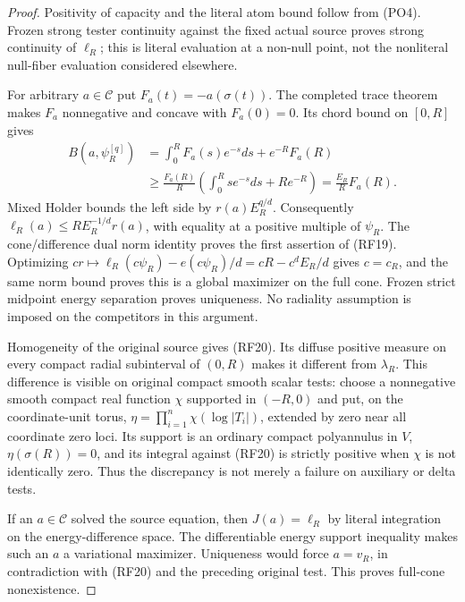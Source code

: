 \documentclass[11pt,a4paper]{article}
\numberwithin{equation}{section}
\theoremstyle{definition}
\theoremstyle{remark}
\begin{document}
\begin{proof}
Positivity of capacity and the literal atom bound
follow from \textup{(PO4)}.  Frozen strong tester
continuity against the fixed actual source proves
strong continuity of $\ell_R$; this is literal
evaluation at a non-null point, not the nonliteral
null-fiber evaluation considered elsewhere.

For arbitrary $a\in\mathscr C$ put
$F_a(t)=-a(\sigma(t))$.  The completed trace theorem
makes $F_a$ nonnegative and concave with $F_a(0)=0$.
Its chord bound on $[0,R]$ gives
\[
 \begin{split}
 B(a,\psi_R^{[q]})
   &=\int_0^R F_a(s)e^{-s}ds+e^{-R}F_a(R)\\
   &\ge\frac{F_a(R)}R
             \left(\int_0^R se^{-s}ds+Re^{-R}\right)
     =\frac{E_R}{R}F_a(R).
 \end{split}
 \tag{RF21}
\]
Mixed Holder bounds the left side by $r(a)E_R^{q/d}$.
Consequently $\ell_R(a)\le R E_R^{-1/d}r(a)$,
with equality at a positive multiple of $\psi_R$.
The cone/difference dual norm identity proves the
first assertion of \textup{(RF19)}.  Optimizing
$cr\mapsto\ell_R(c\psi_R)-e(c\psi_R)/d
=cR-c^dE_R/d$ gives $c=c_R$, and the same norm
bound proves this is a global maximizer on the full
cone.  Frozen strict midpoint energy separation
proves uniqueness.  No radiality assumption is
imposed on the competitors in this argument.

Homogeneity of the original source gives
\textup{(RF20)}.  Its diffuse positive measure on
every compact radial subinterval of $(0,R)$ makes
it different from $\lambda_R$.  This difference is
visible on original compact smooth scalar tests:
choose a nonnegative smooth compact real function
$\chi$ supported in $(-R,0)$ and put, on the
coordinate-unit torus,
$\eta=\prod_{i=1}^n\chi(\log|T_i|)$, extended
by zero near all coordinate zero loci.  Its support
is an ordinary compact polyannulus in $V$,
$\eta(\sigma(R))=0$, and its integral against
\textup{(RF20)} is strictly positive when $\chi$
is not identically zero.  Thus the discrepancy is
not merely a failure on auxiliary or delta tests.

If an $a\in\mathscr C$ solved the source equation,
then $J(a)=\ell_R$ by literal integration on the
energy-difference space.  The differentiable energy
support inequality makes such an $a$ a variational
maximizer.  Uniqueness would force $a=v_R$, in
contradiction with \textup{(RF20)} and the preceding
original test.  This proves full-cone nonexistence.
\end{proof}
\end{document}
